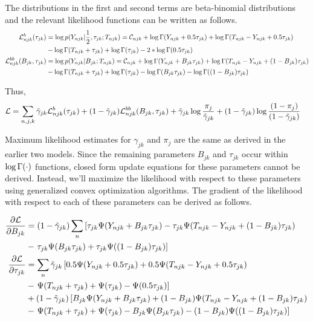 \documentclass[reqno]{amsart}
\numberwithin{equation}{section}
\begin{document}
The distributions in the first and second terms are beta-binomial distributions and the relevant likelihood functions can be written as follows.
\begin{align}
    \mathcal{L}^b_{njk}(\tau_{jk})
        &= \log p(Y_{njk} | \frac{1}{2}, \tau_{jk}; T_{njk})
        = \mathcal{C}_{njk} + \log \Gamma(Y_{njk}+0.5\tau_{jk}) + \log \Gamma(T_{njk}-Y_{njk}+0.5\tau_{jk}) \notag\\
        &- \log \Gamma(T_{njk}+\tau_{jk}) + \log \Gamma(\tau_{jk}) - 2*\log \Gamma(0.5\tau_{jk}) \\
    \mathcal{L}^{bb}_{njk}(B_{jk},\tau_{jk})
        &= \log p(Y_{njk} | B_{jk}; T_{njk})
        = \mathcal{C}_{njk} + \log \Gamma(Y_{njk}+B_{jk}\tau_{jk}) + \log \Gamma(T_{njk}-Y_{njk}+(1-B_{jk})\tau_{jk}) \notag\\
        &- \log \Gamma(T_{njk}+\tau_{jk}) + \log \Gamma(\tau_{jk}) - \log \Gamma(B_{jk}\tau_{jk}) - \log \Gamma((1-B_{jk})\tau_{jk})
\end{align}

Thus,
\begin{align}
    \mathcal{L}
        &= \sum_{n,j,k} \tilde{\gamma}_{jk} \mathcal{L}^b_{njk}(\tau_{jk}) + (1-\tilde{\gamma}_{jk}) \mathcal{L}^{bb}_{njk}(B_{jk},\tau_{jk})
        + \tilde{\gamma}_{jk} \log \frac{\pi_j}{\tilde{\gamma}_{jk}} + (1-\tilde{\gamma}_{jk}) \log \frac{(1-\pi_j)}{(1-\tilde{\gamma}_{jk})}
\end{align}

Maximum likelihood estimates for $\gamma_{jk}$ and $\pi_j$ are the same as derived in the earlier two models. Since the remaining
parameters $B_{jk}$ and $\tau_{jk}$ occur within $\log \Gamma(\cdot)$ functions, closed form update equations
for these parameters cannot be derived. Instead, we'll maximize the likelihood with respect to these parameters using
generalized convex optimization algorithms. The gradient of the likelihood with respect to each of these parameters can be
derived as follows.

\begin{align}
    \frac{\partial \mathcal{L}}{\partial B_{jk}}
        &= (1-\tilde{\gamma}_{jk}) \sum_n \left[ \tau_{jk} \Psi(Y_{njk}+B_{jk}\tau_{jk}) 
        - \tau_{jk} \Psi(T_{njk}-Y_{njk}+(1-B_{jk})\tau_{jk}) \right. \notag\\
        &- \left. \tau_{jk} \Psi(B_{jk}\tau_{jk}) + \tau_{jk} \Psi((1-B_{jk})\tau_{jk}) \right] \\
    \frac{\partial \mathcal{L}}{\partial \tau_{jk}}
        &= \sum_n \tilde{\gamma}_{jk} \left[ 0.5 \Psi(Y_{njk}+0.5\tau_{jk}) + 0.5 \Psi(T_{njk}-Y_{njk}+0.5\tau_{jk}) \right. \notag\\
        &- \left. \Psi(T_{njk}+\tau_{jk}) + \Psi(\tau_{jk}) - \Psi(0.5\tau_{jk}) \right] \notag\\
        &+ (1-\tilde{\gamma}_{jk}) \left[ B_{jk} \Psi(Y_{njk}+B_{jk}\tau_{jk})
        + (1-B_{jk}) \Psi(T_{njk}-Y_{njk}+(1-B_{jk})\tau_{jk}) \right. \notag\\
        &- \left. \Psi(T_{njk}+\tau_{jk}) + \Psi(\tau_{jk}) 
        - B_{jk} \Psi(B_{jk}\tau_{jk}) - (1-B_{jk}) \Psi((1-B_{jk})\tau_{jk}) \right]
\end{align}
\end{document}
